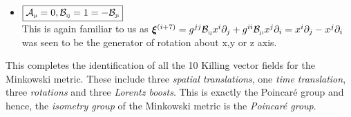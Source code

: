 \begin{itemize}[label=$\triangleright$]
     \begin{align*}
        \Lambda_w^i(t) = \sum\limits_{n=0}^\infty \frac{w^{2n}}{(2n)!}\ t + \sum\limits_{n=0}^\infty \frac{w^{2n+1}}{(2n+1)!}\ x = t\cosh w+x^i \sinh w\\
         \Lambda_w^i(x) = \sum\limits_{n=0}^\infty \frac{w^{2n}}{(2n)!}\ x^i + \sum\limits_{n=0}^\infty \frac{w^{2n+1}}{(2n+1)!}\ t = t\sinh w+x^i \cosh w
     \end{align*}
     This might be a little bit difficult to identify at the first glance. Consider the usual Lorentz transformations,
     \begin{align*}
        t' = \gamma\qty(t-vx)\equiv \gamma\qty(t-\beta x) \qquad x'^i = \gamma(x^i - vt)\equiv \gamma(x^i - \beta t)
     \end{align*}
     where $\beta=v$. Define a quantitiy \textit{rapidity}, $w$, such that $\tanh w:= -\beta $ which gives us the parameters, \begin{align*}
        \gamma&=\frac{1}{\sqrt{1-\beta^2}} = \frac{1}{\sqrt{1-\tanh^2 w}}=\frac{\cosh w}{\sqrt{\cosh^2 w- \sinh^2 w}}=\cosh w\\
       \beta \gamma  &=\tanh w \cosh w = -\sinh w
     \end{align*}
     Then the Lorentz transformation in terms of rapidity becomes:
     $$t' = t\cosh w + x\sinh w\qquad x'^i = x^i \cosh w + t\sinh w$$
     This is exactly the form that we had obtained from the Killing equation and hence we can safely say that this Killing vector field generates \textit{Lorentz boosts} along x,y or z direction.  
      \item $\boxed{\SA\tund{\textmu}=0, \SB\tund{ij}=1 = -\SB\tund{ji} }$ \\[0.2cm]
      This is again familiar to us as $\boldsymbol{\xi}^{(i+7)} = g^{jj}\mathcal B_{\text{\tiny ij}}x^i\partial_j + g^{ii}\mathcal B_{\text{\tiny ji}}x^j\partial_i=x^i\partial_j-x^j\partial_i$ was seen to be the generator of rotation about x,y or z axis.  
\end{itemize}
This completes the identification of all the 10 Killing vector fields for the Minkowski metric. These include three \textit{spatial translations}, one \textit{time translation}, three \textit{rotations} and three \textit{Lorentz boosts}. This is exactly the Poincar\'e group and hence, the \textit{isometry group} of the Minkowski metric is the \textit{Poincar\'e group}. 
